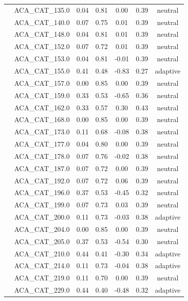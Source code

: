\documentclass[11pt,]{article}
\begin{document}
\begin{longtable}[c]{@{}lcccccc@{}}
& ACA\_CAT\_135.0 & 0.04 & 0.81 & 0.00 & 0.39 & neutral
\\\addlinespace
& ACA\_CAT\_140.0 & 0.07 & 0.75 & 0.01 & 0.39 & neutral
\\\addlinespace
& ACA\_CAT\_148.0 & 0.04 & 0.81 & 0.01 & 0.39 & neutral
\\\addlinespace
& ACA\_CAT\_152.0 & 0.07 & 0.72 & 0.01 & 0.39 & neutral
\\\addlinespace
& ACA\_CAT\_153.0 & 0.04 & 0.81 & -0.01 & 0.39 & neutral
\\\addlinespace
& ACA\_CAT\_155.0 & 0.41 & 0.48 & -0.83 & 0.27 & adaptive
\\\addlinespace
& ACA\_CAT\_157.0 & 0.00 & 0.85 & 0.00 & 0.39 & neutral
\\\addlinespace
& ACA\_CAT\_159.0 & 0.33 & 0.53 & -0.65 & 0.36 & neutral
\\\addlinespace
& ACA\_CAT\_162.0 & 0.33 & 0.57 & 0.30 & 0.43 & neutral
\\\addlinespace
& ACA\_CAT\_168.0 & 0.00 & 0.85 & 0.00 & 0.39 & neutral
\\\addlinespace
& ACA\_CAT\_173.0 & 0.11 & 0.68 & -0.08 & 0.38 & neutral
\\\addlinespace
& ACA\_CAT\_177.0 & 0.04 & 0.80 & 0.00 & 0.39 & neutral
\\\addlinespace
& ACA\_CAT\_178.0 & 0.07 & 0.76 & -0.02 & 0.38 & neutral
\\\addlinespace
& ACA\_CAT\_187.0 & 0.07 & 0.72 & 0.00 & 0.39 & neutral
\\\addlinespace
& ACA\_CAT\_192.0 & 0.07 & 0.72 & 0.06 & 0.39 & neutral
\\\addlinespace
& ACA\_CAT\_196.0 & 0.37 & 0.53 & -0.45 & 0.32 & neutral
\\\addlinespace
& ACA\_CAT\_199.0 & 0.07 & 0.73 & 0.03 & 0.39 & neutral
\\\addlinespace
& ACA\_CAT\_200.0 & 0.11 & 0.73 & -0.03 & 0.38 & adaptive
\\\addlinespace
& ACA\_CAT\_204.0 & 0.00 & 0.85 & 0.00 & 0.39 & neutral
\\\addlinespace
& ACA\_CAT\_205.0 & 0.37 & 0.53 & -0.54 & 0.30 & neutral
\\\addlinespace
& ACA\_CAT\_210.0 & 0.44 & 0.41 & -0.30 & 0.34 & adaptive
\\\addlinespace
& ACA\_CAT\_214.0 & 0.11 & 0.73 & -0.04 & 0.38 & adaptive
\\\addlinespace
& ACA\_CAT\_219.0 & 0.11 & 0.70 & 0.00 & 0.39 & neutral
\\\addlinespace
& ACA\_CAT\_229.0 & 0.44 & 0.40 & -0.48 & 0.32 & adaptive

\end{longtable}
\end{document}
